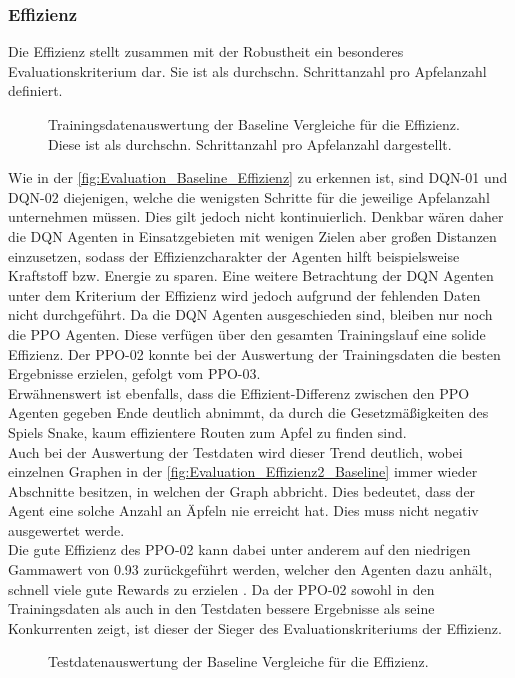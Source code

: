 \subsubsection{Effizienz} \label{sec:Evaluation_Effizienz_Baseline}
Die Effizienz stellt zusammen mit der Robustheit ein besonderes Evaluationskriterium dar. Sie ist als durchschn. Schrittanzahl pro Apfelanzahl definiert.
\begin{figure}[H]
	\centering
	
	\caption[Effizienz - Auswertung der Trainingsdaten der Baseline Vergleiche]{Trainingsdatenauswertung der Baseline Vergleiche für die Effizienz. Diese ist als durchschn. Schrittanzahl pro Apfelanzahl dargestellt.}
	\label{fig:Evaluation_Baseline_Effizienz}
\end{figure}
Wie in der \autoref{fig:Evaluation_Baseline_Effizienz} zu erkennen ist, sind DQN-01 und DQN-02 diejenigen, welche die wenigsten Schritte für die jeweilige Apfelanzahl unternehmen müssen. Dies gilt jedoch nicht kontinuierlich. Denkbar wären daher die DQN Agenten in Einsatzgebieten mit wenigen Zielen aber großen Distanzen einzusetzen, sodass der Effizienzcharakter der Agenten hilft beispielsweise Kraftstoff bzw. Energie zu sparen.
Eine weitere Betrachtung der DQN Agenten unter dem Kriterium der Effizienz wird jedoch aufgrund der fehlenden Daten nicht durchgeführt.
Da die DQN Agenten ausgeschieden sind, bleiben nur noch die PPO Agenten. Diese verfügen über den gesamten Trainingslauf eine solide Effizienz.
Der PPO-02 konnte bei der Auswertung der Trainingsdaten die besten Ergebnisse erzielen, gefolgt vom PPO-03.\\
Erwähnenswert ist ebenfalls, dass die Effizient-Differenz zwischen den PPO Agenten gegeben Ende deutlich abnimmt, da durch die Gesetzmäßigkeiten des Spiels Snake, kaum effizientere Routen zum Apfel zu finden sind.\\
Auch bei der Auswertung der Testdaten wird dieser Trend deutlich, wobei
einzelnen Graphen in der \autoref{fig:Evaluation_Effizienz2_Baseline} immer wieder Abschnitte besitzen, in welchen der Graph abbricht. Dies bedeutet, dass der Agent eine solche Anzahl an Äpfeln nie erreicht hat. Dies muss nicht negativ ausgewertet werde.\\
Die gute Effizienz des PPO-02 kann dabei unter anderem auf den niedrigen Gammawert von 0.93 zurückgeführt werden, welcher den Agenten dazu anhält, schnell viele gute Rewards zu erzielen . Da der PPO-02 sowohl in den Trainingsdaten als auch in den Testdaten bessere Ergebnisse als seine Konkurrenten zeigt, ist dieser der Sieger des Evaluationskriteriums der Effizienz.
\begin{figure}[H]
	\centering
	
	\caption[Effizienz - Auswertung der Testdaten der Baseline Vergleiche]{Testdatenauswertung der Baseline Vergleiche für die Effizienz.}
	\label{fig:Evaluation_Effizienz2_Baseline}
\end{figure}

